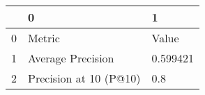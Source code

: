 \begin{tabular}{lll}
\toprule
{} &                       0 &         1 \\
\midrule
0 &                  Metric &     Value \\
1 &       Average Precision &  0.599421 \\
2 &  Precision at 10 (P@10) &       0.8 \\
\bottomrule
\end{tabular}
